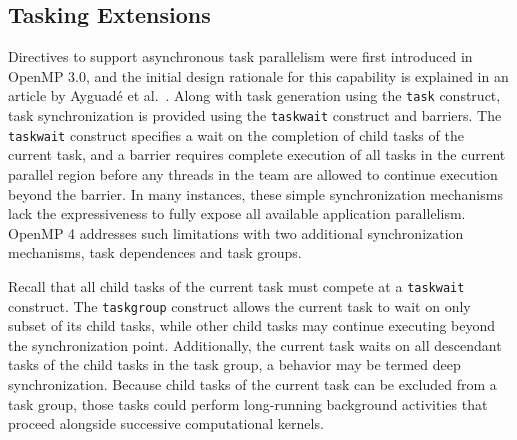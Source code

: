 \subsection{Tasking Extensions}
\label{sub:tasking}



Directives to support asynchronous task parallelism were first introduced in OpenMP 3.0, and the initial design rationale for this capability is explained in an article by Ayguad\'{e} et al.~\cite{ayguade2009tpds}.  Along with task generation using the \texttt{task} construct, task synchronization is provided using the \texttt{taskwait} construct and barriers.  The \texttt{taskwait} construct specifies a wait on the completion of child tasks of the current task, and a barrier requires complete execution of all tasks in the current parallel region before any threads in the team are allowed to continue execution beyond the barrier.  In many instances, these simple synchronization mechanisms lack the expressiveness to fully expose all available application parallelism.  OpenMP 4 addresses such limitations with two additional synchronization mechanisms, task dependences and task groups.




Recall that all child tasks of the current task must compete at a \texttt{taskwait} construct.  The \texttt{taskgroup} construct allows the current task to wait on only subset of its child tasks, while other child tasks may continue executing beyond the synchronization point.  Additionally, the current task waits on all descendant tasks of the child tasks in the task group, a behavior may be termed deep synchronization.  Because child tasks of the current task can be excluded from a task group, those tasks could perform long-running background activities that proceed alongside successive computational kernels.


